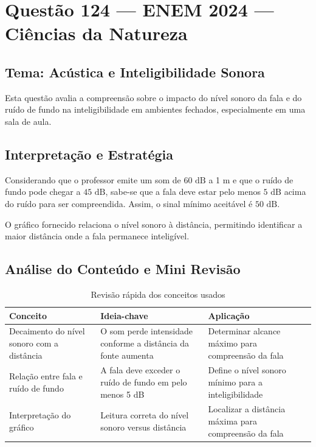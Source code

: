 \documentclass{article}
\begin{document}
\section*{Questão 124 — ENEM 2024 — Ciências da Natureza}

\subsection*{Tema: Acústica e Inteligibilidade Sonora}

Esta questão avalia a compreensão sobre o impacto do nível sonoro da fala e do ruído de fundo na inteligibilidade em ambientes fechados, especialmente em uma sala de aula.

\subsection*{Interpretação e Estratégia}
Considerando que o professor emite um som de $60\text{ dB}$ a 1 m e que o ruído de fundo pode chegar a $45\text{ dB}$, sabe-se que a fala deve estar pelo menos $5\text{ dB}$ acima do ruído para ser compreendida. Assim, o sinal mínimo aceitável é $50\text{ dB}$.

O gráfico fornecido relaciona o nível sonoro à distância, permitindo identificar a maior distância onde a fala permanece inteligível.

\subsection*{Análise do Conteúdo e Mini Revisão}
\begin{table}[h!]
\centering
\begin{tabular}{|p{5cm}|p{6cm}|p{6cm}|}
\hline
\textbf{Conceito} & \textbf{Ideia-chave} & \textbf{Aplicação} \\
\hline
Decaimento do nível sonoro com a distância & O som perde intensidade conforme a distância da fonte aumenta & Determinar alcance máximo para compreensão da fala \\
\hline
Relação entre fala e ruído de fundo & A fala deve exceder o ruído de fundo em pelo menos 5 dB & Define o nível sonoro mínimo para a inteligibilidade \\
\hline
Interpretação do gráfico & Leitura correta do nível sonoro versus distância & Localizar a distância máxima para compreensão da fala \\
\hline
\end{tabular}
\caption{Revisão rápida dos conceitos usados}
\end{table}
\end{document}
